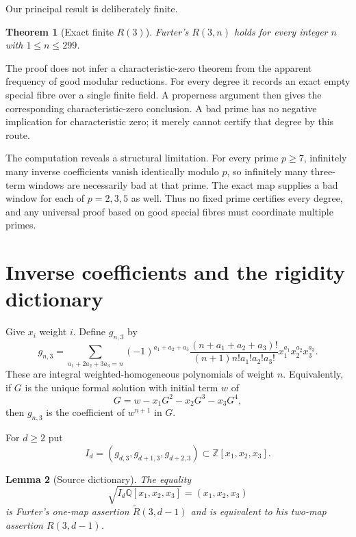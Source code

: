 \documentclass[11pt]{article}
\newtheorem{theorem}{Theorem}[section]
\newtheorem{lemma}[theorem]{Lemma}
\theoremstyle{definition}
\newcommand{\QQ}{\mathbb{Q}}
\newcommand{\ZZ}{\mathbb{Z}}
\begin{document}
Our principal result is deliberately finite.

\begin{theorem}[Exact finite $R(3)$]\label{thm:main}
Furter's $R(3,n)$ holds for every integer $n$ with $1\le n\le299$.
\end{theorem}

The proof does not infer a characteristic-zero theorem from the apparent
frequency of good modular reductions.  For every degree it records an exact
empty special fibre over a single finite field.  A properness argument then
gives the corresponding characteristic-zero conclusion.  A bad prime has no
negative implication for characteristic zero; it merely cannot certify that
degree by this route.

The computation reveals a structural limitation.  For every prime $p\ge7$,
infinitely many inverse coefficients vanish identically modulo $p$, so
infinitely many three-term windows are necessarily bad at that prime.  The
exact map supplies a bad window for each of $p=2,3,5$ as well.  Thus no fixed
prime certifies every degree, and any universal proof based on good special
fibres must coordinate multiple primes.

\section{Inverse coefficients and the rigidity dictionary}

Give $x_i$ weight $i$.  Define $g_{n,3}$ by
\begin{equation}\label{eq:g-explicit}
g_{n,3}=\sum_{a_1+2a_2+3a_3=n}
(-1)^{a_1+a_2+a_3}
\frac{(n+a_1+a_2+a_3)!}
{(n+1)n!a_1!a_2!a_3!}
x_1^{a_1}x_2^{a_2}x_3^{a_3}.
\end{equation}
These are integral weighted-homogeneous polynomials of weight $n$.  Equivalently,
if $G$ is the unique formal solution with initial term $w$ of
\begin{equation}\label{eq:inverse-series}
G=w-x_1G^2-x_2G^3-x_3G^4,
\end{equation}
then $g_{n,3}$ is the coefficient of $w^{n+1}$ in $G$.

For $d\ge2$ put
\[
 I_d=(g_{d,3},g_{d+1,3},g_{d+2,3})\subset\ZZ[x_1,x_2,x_3].
\]

\begin{lemma}[Source dictionary]\label{lem:dictionary}
The equality
\[
 \sqrt{I_d\QQ[x_1,x_2,x_3]}=(x_1,x_2,x_3)
\]
is Furter's one-map assertion $\widetilde R(3,d-1)$ and is equivalent to his
two-map assertion $R(3,d-1)$.
\end{lemma}
\end{document}
